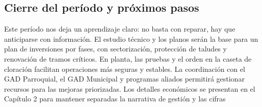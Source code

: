\subsection*{Cierre del período y próximos pasos}
Este período nos deja un aprendizaje claro: no basta con reparar, hay que anticiparse con información. El estudio técnico y los planos serán la base para un plan de inversiones por fases, con sectorización, protección de taludes y renovación de tramos críticos. En planta, las pruebas y el orden en la caseta de cloración facilitan operaciones más seguras y estables. La coordinación con el GAD Parroquial, el GAD Municipal y programas aliados permitirá gestionar recursos para las mejoras priorizadas. Los detalles económicos se presentan en el Capítulo 2 para mantener separadas la narrativa de gestión y las cifras
